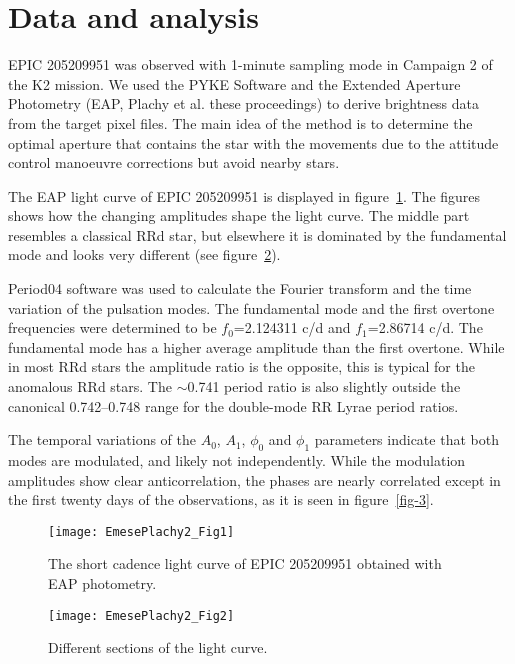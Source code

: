 \documentclass[epj,twocolumn]{webofc}
\begin{document}
\section{Data and analysis}
\label{sec-1}


EPIC 205209951 was observed with 1-minute sampling mode in Campaign 2 of the K2 mission. We used the PYKE Software \cite{still} and the Extended Aperture Photometry (EAP, Plachy et al. these proceedings) to derive brightness data from the target pixel files. The main idea of the method is to determine the optimal  aperture that contains the star with the movements due to the attitude control manoeuvre corrections but avoid nearby stars. 

The EAP light curve of EPIC 205209951 is displayed in figure~\ref{fig-1}.
The figures shows how the changing amplitudes shape the light curve. The middle part resembles a classical RRd star, but elsewhere it is dominated by the fundamental mode and looks very different (see figure~\ref{fig-2}).

Period04 software \cite{period04} was used to calculate the Fourier transform and the time variation of the pulsation modes. The fundamental mode and the first overtone  frequencies were determined to be  $f_0$=2.124311  c/d and $f_1$=2.86714 c/d. The fundamental mode has a higher average amplitude than the first overtone. While in most RRd stars the amplitude ratio is the opposite, this is typical for the anomalous RRd stars. The $\sim$0.741 period ratio is also slightly outside the canonical 0.742–0.748 range for the double-mode RR Lyrae period ratios. 

The temporal variations of the $A_0$, $A_1$, $\phi_0$ and $\phi_1$ parameters indicate that both modes are modulated, and likely not independently. While the modulation amplitudes show clear anticorrelation, the phases are nearly correlated except in the first twenty days of the observations, as it is seen in figure~\ref{fig-3}.


\begin{figure}
\centering
\texttt{[image: EmesePlachy2\_Fig1]}
\caption{The short cadence light curve of EPIC 205209951 obtained with EAP photometry.}
\label{fig-1}       %
\end{figure}

\begin{figure}
\centering
\texttt{[image: EmesePlachy2\_Fig2]}
\caption{Different sections of the light curve.}
\label{fig-2}       %
\end{figure}
\end{document}
